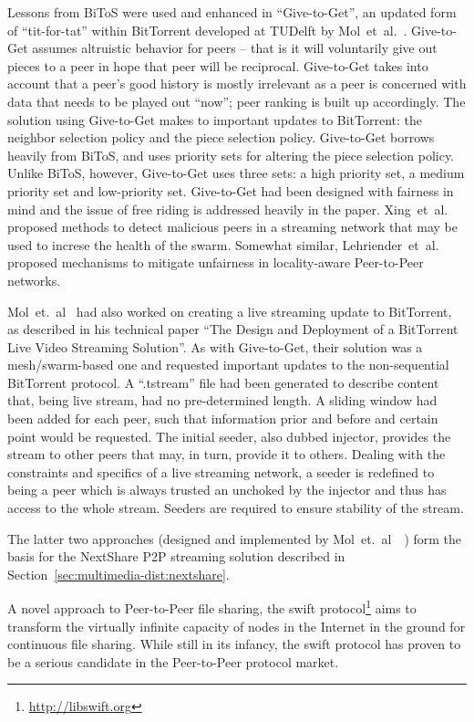 Lessons from BiToS were used and enhanced in ``Give-to-Get'', an updated form
of ``tit-for-tat'' within BitTorrent developed at TUDelft by
Mol~et~al.~\cite{give-to-get}. Give-to-Get assumes altruistic behavior for
peers -- that is it will voluntarily give out pieces to a peer in hope that
peer will be reciprocal. Give-to-Get takes into account that a peer's good
history is mostly irrelevant as a peer is concerned with data that needs to be
played out ``now''; peer ranking is built up accordingly. The solution using
Give-to-Get makes to important updates to BitTorrent: the neighbor selection
policy and the piece selection policy. Give-to-Get borrows heavily from BiToS,
and uses priority sets for altering the piece selection policy. Unlike BiToS,
however, Give-to-Get uses three sets: a high priority set, a medium priority
set and low-priority set. Give-to-Get had been designed with fairness in mind
and the issue of free riding is addressed heavily in the paper.
Xing~et~al.~\cite{malicious-p2p} proposed methods to detect malicious peers in
a streaming network that may be used to increse the health of the swarm.
Somewhat similar, Lehriender~et~al.~\cite{mitigating-unfairness} proposed
mechanisms to mitigate unfairness in locality-aware Peer-to-Peer networks.

Mol~et.~al~\cite{design-p2p-live} had also worked on creating a live streaming
update to BitTorrent, as described in his technical paper ``The Design and
Deployment of a BitTorrent Live Video Streaming Solution''. As with
Give-to-Get, their solution was a mesh/swarm-based one and requested important
updates to the non-sequential BitTorrent protocol. A ``.tstream'' file had
been generated to describe content that, being live stream, had no
pre-determined length. A sliding window had been added for each peer, such
that information prior and before and certain point would be requested. The
initial seeder, also dubbed injector, provides the stream to other peers that
may, in turn, provide it to others. Dealing with the constraints and specifics
of a live streaming network, a seeder is redefined to being a peer which is
always trusted an unchoked by the injector and thus has access to the whole
stream. Seeders are required to ensure stability of the stream.

The latter two approaches (designed and implemented by
Mol~et.~al~\cite{give-to-get}~\cite{design-p2p-live}) form the basis for the
NextShare P2P streaming solution described in
Section~\ref{sec:multimedia-dist:nextshare}.

A novel approach to Peer-to-Peer file sharing, the swift
protocol\footnote{\url{http://libswift.org}} aims to transform the virtually
infinite capacity of nodes in the Internet in the ground for continuous file
sharing. While still in its infancy, the swift protocol has proven to be a
serious candidate in the Peer-to-Peer protocol market.


